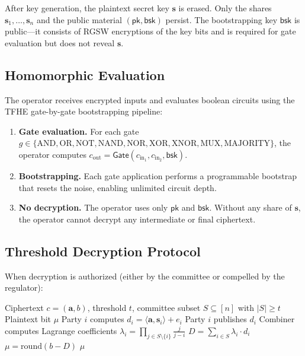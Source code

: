 After key generation, the plaintext secret key $\mathbf{s}$ is erased.
Only the shares $\mathbf{s}_1, \ldots, \mathbf{s}_n$ and the public
material $(\mathsf{pk}, \mathsf{bsk})$ persist.  The bootstrapping key
$\mathsf{bsk}$ is public---it consists of RGSW encryptions of the key
bits and is required for gate evaluation but does not reveal
$\mathbf{s}$.

\subsection{Homomorphic Evaluation}

The operator receives encrypted inputs and evaluates boolean circuits
using the TFHE gate-by-gate bootstrapping pipeline:

\begin{enumerate}[nosep]
  \item \textbf{Gate evaluation.}  For each gate $g \in \{\text{AND},
        \text{OR}, \text{NOT}, \text{NAND}, \text{NOR}, \text{XOR},
        \text{XNOR}, \text{MUX}, \text{MAJORITY}\}$, the operator
        computes $c_{\text{out}} = \mathsf{Gate}(c_{\text{in}_1},
        c_{\text{in}_2}, \mathsf{bsk})$.
  \item \textbf{Bootstrapping.}  Each gate application performs a
        programmable bootstrap that resets the noise, enabling
        unlimited circuit depth.
  \item \textbf{No decryption.}  The operator uses only
        $\mathsf{pk}$ and $\mathsf{bsk}$.  Without any share of
        $\mathbf{s}$, the operator cannot decrypt any intermediate
        or final ciphertext.
\end{enumerate}

\subsection{Threshold Decryption Protocol}

When decryption is authorized (either by the committee or compelled by
the regulator):

\begin{algorithm}[H]
\caption{Threshold Decryption}
\label{alg:decrypt}
\begin{algorithmic}[1]
\Require Ciphertext $c = (\mathbf{a}, b)$, threshold $t$, committee
         subset $S \subseteq [n]$ with $|S| \geq t$
\Ensure Plaintext bit $\mu$
  \State Party $i$ computes $d_i = \langle \mathbf{a}, \mathbf{s}_i
         \rangle + e_i$ 
  \State Party $i$ publishes $d_i$
\EndFor
\State Combiner computes Lagrange coefficients
       $\lambda_i = \prod_{j \in S \setminus \{i\}} \frac{j}{j - i}$
\State $D = \sum_{i \in S} \lambda_i \cdot d_i$
\State $\mu = \text{round}(b - D)$
\State \Return $\mu$
\end{algorithmic}
\end{algorithm}

